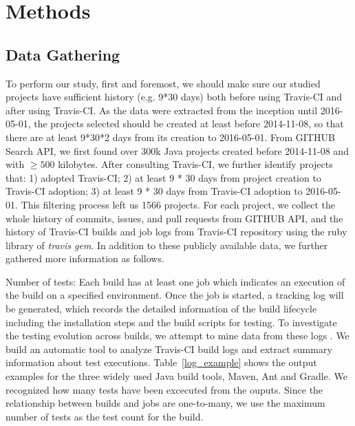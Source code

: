 
\section{Methods}
\label{sec:method}

\subsection{Data Gathering}

To perform our study, first and foremost, we should make sure our studied projects have sufficient history (e.g. 9*30 days) both before using Travis-CI and after using Travis-CI.  As the data were extracted from the inception until 2016-05-01, the projects selected should be created at least before 2014-11-08, so that there are at least 9*30*2 days from its creation to 2016-05-01. 
From GITHUB Search API, we first found over 300k Java projects created before 2014-11-08 and with $\geqslant 500$ kilobytes. After consulting Travis-CI, we further identify projects that: 1) adopted Travis-CI; 2) at least 9 * 30 days from project creation to Travis-CI adoption; 3) at least 9 * 30 days from Travis-CI adoption to 2016-05-01. This filtering process left us 1566 projects.  
For each project, we collect the whole history of commits, issues, and pull requests from GITHUB API, and the history of Travis-CI builds and job logs from Travis-CI repository using the ruby library of \textit{travis gem}.  In addition to these publicly available data, we further gathered more information as follows.


Number of tests: 
Each build has at least one job which indicates an execution of the build on a specified environment. Once the job is started, a tracking log will be generated, which records the detailed information of the build lifecycle including the installation steps and the build scripts for testing. To investigate the testing evolution across builds, we attempt to mine data from these logs . We build an automatic tool to analyze Travis-CI build logs and extract summary information about test executions. Table~\ref{log_example} shows the output examples for the three widely used Java build tools, \ie Maven, Ant and Gradle. We recognized how many tests have been excecuted from the ouputs. Since the relationship between builds and jobs are one-to-many, we use the maximum number of tests as the test count for the build. 

